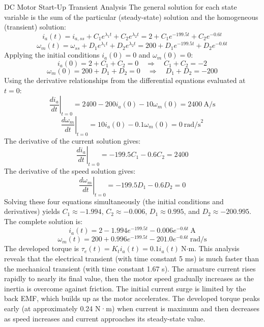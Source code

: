 \begin{example}{DC Motor Start-Up Transient Analysis}
The general solution for each state variable is the sum of the particular (steady-state) solution and the homogeneous (transient) solution:
\begin{equation}
i_a(t) = i_{a,ss} + C_1 e^{\lambda_1 t} + C_2 e^{\lambda_2 t} = 2 + C_1 e^{-199.5t} + C_2 e^{-0.6t}
\end{equation}
\begin{equation}
\omega_m(t) = \omega_{ss} + D_1 e^{\lambda_1 t} + D_2 e^{\lambda_2 t} = 200 + D_1 e^{-199.5t} + D_2 e^{-0.6t}
\end{equation}
Applying the initial conditions $i_a(0) = 0$ and $\omega_m(0) = 0$:
\begin{equation}
i_a(0) = 2 + C_1 + C_2 = 0 \quad\Rightarrow\quad C_1 + C_2 = -2
\end{equation}
\begin{equation}
\omega_m(0) = 200 + D_1 + D_2 = 0 \quad\Rightarrow\quad D_1 + D_2 = -200
\end{equation}
Using the derivative relationships from the differential equations evaluated at $t = 0$:
\begin{equation}
\left.\frac{di_a}{dt}\right|_{t=0} = 2400 - 200i_a(0) - 10\omega_m(0) = 2400\ \text{A/s}
\end{equation}
\begin{equation}
\left.\frac{d\omega_m}{dt}\right|_{t=0} = 10i_a(0) - 0.1\omega_m(0) = 0\ \text{rad/s}^2
\end{equation}
The derivative of the current solution gives:
\begin{equation}
\left.\frac{di_a}{dt}\right|_{t=0} = -199.5C_1 - 0.6C_2 = 2400
\end{equation}
The derivative of the speed solution gives:
\begin{equation}
\left.\frac{d\omega_m}{dt}\right|_{t=0} = -199.5D_1 - 0.6D_2 = 0
\end{equation}
Solving these four equations simultaneously (the initial conditions and derivatives) yields $C_1 \approx -1.994$, $C_2 \approx -0.006$, $D_1 \approx 0.995$, and $D_2 \approx -200.995$. The complete solution is:
\begin{equation}
i_a(t) = 2 - 1.994e^{-199.5t} - 0.006e^{-0.6t}\ \text{A}
\end{equation}
\begin{equation}
\omega_m(t) = 200 + 0.996e^{-199.5t} - 201.0e^{-0.6t}\ \text{rad/s}
\end{equation}
The developed torque is $\tau_e(t) = K_t i_a(t) = 0.1i_a(t)\ \text{N·m}$. This analysis reveals that the electrical transient (with time constant 5 ms) is much faster than the mechanical transient (with time constant 1.67 s). The armature current rises rapidly to nearly its final value, then the motor speed gradually increases as the inertia is overcome against friction. The initial current surge is limited by the back EMF, which builds up as the motor accelerates. The developed torque peaks early (at approximately 0.24 N·m) when current is maximum and then decreases as speed increases and current approaches its steady-state value.
\end{example}

